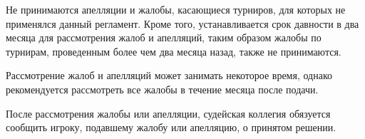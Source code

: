 Не принимаются апелляции и жалобы, касающиеся турниров, для которых не применялся данный регламент. Кроме того, устанавливается срок давности в два месяца для рассмотрения жалоб и апелляций, таким образом жалобы по турнирам, проведенным более чем два месяца назад, также не принимаются.

Рассмотрение жалоб и апелляций может занимать некоторое время, однако рекомендуется рассмотреть все жалобы в течение месяца после подачи. 

После рассмотрения жалобы или апелляции, судейская коллегия обязуется сообщить игроку, подавшему жалобу или апелляцию, о принятом решении.